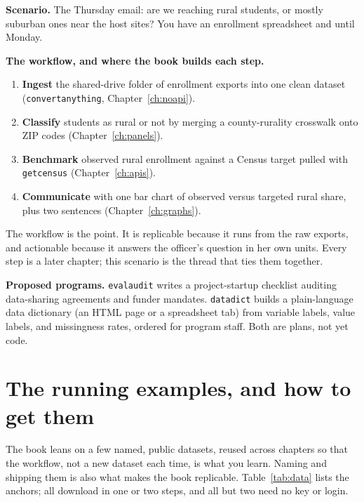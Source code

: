 \documentclass[
    a4paper,
    fontsize=10pt,
    twoside=true,
    numbers=noenddot,
]{kaobook}
\newcounter{appliedexample}
\newenvironment{appliedexample}[1][]{%
    \refstepcounter{appliedexample}%
    \begin{appliedexamplebox}[frametitle={Applied Example~\theappliedexample.~~#1}]%
}{%
    \end{appliedexamplebox}%
}
\begin{document}
\begin{appliedexample}[From a funder's question to a one-page answer]
\textbf{Scenario.} The Thursday email: are we reaching rural students, or mostly suburban ones near the host sites? You have an enrollment spreadsheet and until Monday.

\medskip
\textbf{The workflow, and where the book builds each step.}
\begin{enumerate}
    \item \textbf{Ingest} the shared-drive folder of enrollment exports into one clean dataset (\texttt{convertanything}, Chapter~\ref{ch:noapi}).
    \item \textbf{Classify} students as rural or not by merging a county-rurality crosswalk onto ZIP codes (Chapter~\ref{ch:panels}).
    \item \textbf{Benchmark} observed rural enrollment against a Census target pulled with \texttt{getcensus} (Chapter~\ref{ch:apis}).
    \item \textbf{Communicate} with one bar chart of observed versus targeted rural share, plus two sentences (Chapter~\ref{ch:graphs}).
\end{enumerate}
The workflow is the point. It is replicable because it runs from the raw exports, and actionable because it answers the officer's question in her own units. Every step is a later chapter; this scenario is the thread that ties them together.
\end{appliedexample}

\begin{kaobox}[frametitle=Ado-file Idea: \texttt{evalaudit} and \texttt{datadict}]
\textbf{Proposed programs.} \texttt{evalaudit} writes a project-startup checklist auditing data-sharing agreements and funder mandates. \texttt{datadict} builds a plain-language data dictionary (an HTML page or a spreadsheet tab) from variable labels, value labels, and missingness rates, ordered for program staff. Both are plans, not yet code.
\end{kaobox}

\section{The running examples, and how to get them}
The book leans on a few named, public datasets, reused across chapters so that the workflow, not a new dataset each time, is what you learn. Naming and shipping them is also what makes the book replicable. Table~\ref{tab:data} lists the anchors; all download in one or two steps, and all but two need no key or login.
\end{document}

